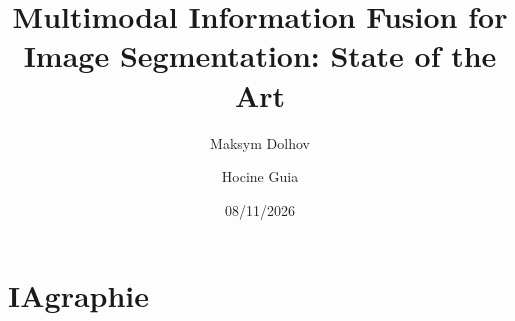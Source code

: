 \documentclass[11pt,a4paper]{article}
\title{Multimodal Information Fusion for Image Segmentation: State of the Art}
\author{Maksym Dolhov \and Hocine Guia}
\date{08/11/2026}
\begin{document}
\maketitle

\begin{abstract}
\end{abstract}










\section*{IAgraphie}
\end{document}
